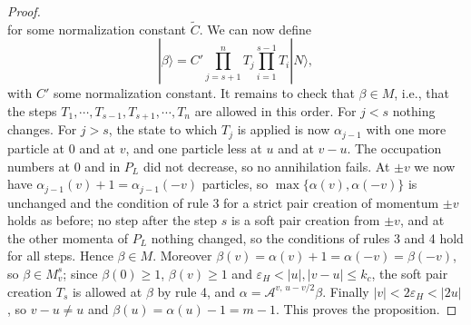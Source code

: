 \documentclass[11pt]{article}
\numberwithin{equation}{section}
\newcommand{\e}{\varepsilon}
\newcommand\al{{\alpha}}
\newcommand\be{\beta}
\theoremstyle{definition}
\begin{document}
\begin{proof}
\[\]
for some normalization constant $\widetilde C$. We can now define
\[
|\beta \rangle =    C'     \prod_{j=s+1}^n  T_j    \prod_{i=1}^{s-1} T_i |N\rangle,
\]
with $C'$ some normalization constant.
It remains to check that $\be\in M$, i.e., that the steps $T_1,\cdots,T_{s-1},T_{s+1},\cdots,T_n$ are allowed in this order.
For $j<s$ nothing changes. For $j>s$, the state to which $T_j$ is applied is now $\al_{j-1}$ with one more particle at $0$ and at $v$, and one particle less at $u$ and at $v-u$.
The occupation numbers at $0$ and in $P_L$ did not decrease, so no annihilation fails.
At $\pm v$ we now have $\al_{j-1}(v)+1=\al_{j-1}(-v)$ particles, so $\max\{\al(v),\al(-v)\}$ is unchanged and the condition of rule 3 for a strict pair creation of momentum $\pm v$ holds as before;
no step after the step $s$ is a soft pair creation from $\pm v$, and at the other momenta of $P_L$ nothing changed, so the conditions of rules 3 and 4 hold for all steps. Hence $\be\in M$.
Moreover $\be(v)=\al(v)+1=\al(-v)=\be(-v)$, so $\be\in M^s_v$; since $\be(0)\geq1$, $\be(v)\geq1$ and $\e_H<|u|,|v-u|\leq k_c$, the soft pair creation $T_s$ is allowed at $\be$ by rule 4,
and $\al=\mathcal A^{v,\,u-v/2}\be$. Finally $|v|<2\e_H<|2u|$, so $v-u\neq u$ and $\be(u)=\al(u)-1=m-1$.
This proves the proposition.

\end{proof}



\end{document}
